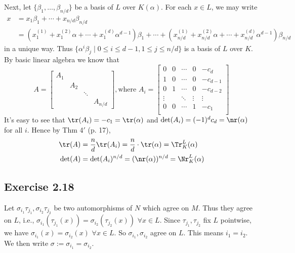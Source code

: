 \documentclass[../Chapter.tex]{subfiles}
\begin{document}
Next, let $\{\beta_1,\ldots,\beta_{n/d}\}$ be a basis of $L$ over $K(\alpha)$. For each $x\in L$, we may write
\begin{align*}
x &= x_1\beta_1+\cdots+x_{n/d}\beta_{n/d} \\ &=(x^{(1)}_{1}+x^{(2)}_{1}\alpha+\cdots+x^{(d)}_{1}\alpha^{d-1})\beta_1+\cdots+(x^{(1)}_{n/d}+x^{(2)}_{n/d}\alpha+\cdots+x^{(d)}_{n/d}\alpha^{d-1})\beta_{n/d}
\end{align*} in a unique way. Thus $\{\alpha^{i}\beta_j\mid 0\leq i\leq d-1,1\leq j \leq n/d\}$ is a basis of $L$ over $K$. By basic linear algebra we know that $$A=\begin{bmatrix}
A_1 &         &             &               \\
       & A_2 &             &               \\
       &         & \ddots &               \\
       &         &             & A_{n/d}
\end{bmatrix}, \text{where }
A_i=\begin{bmatrix}
0          & 0  & \cdots & 0         & -c_d       \\
1           & 0 & \cdots & 0          & -c_{d-1} \\
0          & 1  & \cdots & 0          & -c_{d-2}     \\
\vdots &     & \ddots & \vdots & \vdots       \\
0         & 0  & \cdots & 1           & -c_1       \\
\end{bmatrix}
$$
It's easy to see that $\tr(A_i)=-c_1=\tr(\alpha)$ and $\det(A_i)=(-1)^dc_d=\nr(\alpha)$ for all $i$. Hence by Thm 4$'$ (p. 17),
\begin{align*}
\tr(A)&=\frac{n}{d}\tr(A_i)=\frac{n}{d}\cdot\tr(\alpha)=\Tr^L_K(\alpha)\\
\det(A)&=\det(A_i)^{n/d}=(\nr(\alpha))^{n/d}=\Nr^L_K(\alpha)
\end{align*}

\subsection*{Exercise 2.18}

Let $\sigma_{i_1}\tau_{j_1},\sigma_{i_2}\tau_{j_2}$ be two automorphisms of $N$ which agree on $M$. Thus they agree on $L$, i.e., $\sigma_{i_1}(\tau_{j_1}(x))=\sigma_{i_2}(\tau_{j_2}(x))$ $\forall x\in L$. Since $\tau_{j_1},\tau_{j_2}$ fix $L$ pointwise, we have $\sigma_{i_1}(x)=\sigma_{i_2}(x)$ $\forall x\in L$. So $\sigma_{i_1},\sigma_{i_2}$ agree on $L$. This means $i_1=i_2$. We then write $\sigma:=\sigma_{i_1}=\sigma_{i_2}$.
\end{document}
